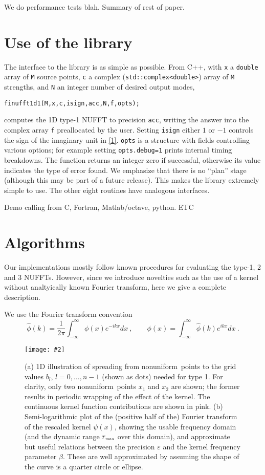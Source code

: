 \documentclass[10pt]{article}
\newcommand{\be}{\begin{equation}}
\newcommand{\ee}{\end{equation}}
\newcommand{\bfi}{\begin{figure}}
\newcommand{\efi}{\end{figure}}
\newcommand{\ca}[2]{\caption{#1 \label{#2}}}
\newcommand{\ig}[2]{\texttt{[image: \#2]}}
\newcommand{\tbox}[1]{{\mbox{\tiny #1}}}
\newcommand{\eps}{\varepsilon}
\newcommand{\intR}{\int_{-\infty}^\infty}
\newcommand{\rmax}{r_\tbox{max}}    %
\newcommand{\NU}{{nonuniform}}       %
\begin{document}
We do performance tests blah.
Summary of rest of paper.


\section{Use of the library}

The interface to the library is as
simple as possible.
From C++, with {\tt x} a {\tt double} array of {\tt M} source points,
{\tt c} a complex ({\tt std::complex<double>}) array of {\tt M} strengths,
and {\tt N} an integer number of desired output modes,
\begin{verbatim}
finufft1d1(M,x,c,isign,acc,N,f,opts);
\end{verbatim}
computes the 1D type-1 NUFFT to precision {\tt acc}, writing the
answer into the complex array {\tt f} preallocated by the user.
Setting {\tt isign} either $1$ or $-1$ controls the
sign of the imaginary unit in \eqref{1}.
{\tt opts} is a structure with fields controlling various options;
for example setting {\tt opts.debug=1} prints internal timing breakdowns.
The function returns an integer zero if successful, otherwise
its value indicates the type of error found.
We emphasize that there is no ``plan'' stage
(although this may be part of a future release).
This makes the library extremely simple to use.
The other eight routines have analogous interfaces.


Demo calling from C, Fortran, Matlab/octave, python.
ETC


\section{Algorithms}

Our implementations mostly follow known procedures
for evaluating the type-1, 2 and 3 NUFFTs.
However, since we introduce novelties such as the
use of a kernel without analtyically known Fourier transform,
here we give a complete description.

We use the Fourier transform convention
\be
\hat\phi(k) = \frac{1}{2\pi} \intR \phi(x) e^{-ikx} dx
~,\qquad
\phi(x) = \intR \hat\phi(k) e^{ikx} dx
~.
\label{ft}
\ee


\bfi[t]  %
\ig{width=6.5in}{spreadalias.eps}
\ca{(a) 1D illustration of spreading from \NU\ points to the grid
  values $b_l$, $l=0,\dots,n-1$ (shown as dots) needed for type 1.
  For clarity, only two \NU\ points $x_1$ and $x_2$ are shown;
  the former results in periodic wrapping of the effect of the kernel.
  The continuous kernel function contributions are shown in pink.
  (b) Semi-logarithmic plot of the (positive half of the)
  Fourier transform of the rescaled
  kernel $\psi(x)$, showing the usable frequency domain (and the
  dynamic range $\rmax$ over this domain), and approximate
  but useful relations between the precision $\eps$
  and the kernel frequency parameter $\beta$.
  These are well approximated by assuming the shape of the curve is
  a quarter circle or ellipse.
}{f:spreadalias}
\efi
\end{document}
